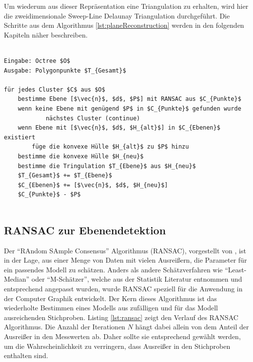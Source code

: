 Um wiederum aus dieser Repräsentation eine Triangulation zu erhalten, wird hier die zweidimensionale Sweep-Line Delaunay Triangulation durchgeführt. Die Schritte aus dem Algorithmus \ref{lst:planeReconstruction} werden in den folgenden Kapiteln näher beschreiben.

\begin{lstlisting}[mathescape,caption=Planaren Echtzeit Rekonstruktion, label=lst:planeReconstruction]

Eingabe: Octree $O$
Ausgabe: Polygonpunkte $T_{Gesamt}$

für jedes Cluster $C$ aus $O$
    bestimme Ebene [$\vec{n}$, $d$, $P$] mit RANSAC aus $C_{Punkte}$
    wenn keine Ebene mit genügend $P$ in $C_{Punkte}$ gefunden wurde
    		nächstes Cluster (continue)
    wenn Ebene mit [$\vec{n}$, $d$, $H_{alt}$] in $C_{Ebenen}$ existiert	
        füge die konvexe Hülle $H_{alt}$ zu $P$ hinzu	
    bestimme die konvexe Hülle $H_{neu}$
    bestimme die Tringulation $T_{Ebene}$ aus $H_{neu}$
    $T_{Gesamt}$ += $T_{Ebene}$
    $C_{Ebenen}$ += [$\vec{n}$, $d$, $H_{neu}$]
    $C_{Punkte}$ - $P$
		

\end{lstlisting}

\subsection{RANSAC zur Ebenendetektion}

Der \enquote{RAndom SAmple Consensus} Algorithmus (RANSAC), vorgestellt von \citet{fischler1981random}, ist in der Lage, aus einer Menge von Daten mit vielen Ausreißern, die Parameter für ein passendes Modell zu schätzen. Anders als andere Schätzverfahren wie \enquote{Least-Median} oder \enquote{M-Schätzer}, welche aus der Statistik Literatur entnommen und entsprechend angepasst wurden, wurde RANSAC speziell für die Anwendung in der Computer Graphik entwickelt. Der Kern dieses Algorithmus ist das wiederholte Bestimmen eines Modells aus zufälligen und für das Modell ausreichenden Stichproben. Listing \ref{lst:ransac} zeigt den Verlauf des RANSAC Algorithmus. Die Anzahl der Iterationen \(N\) hängt dabei allein von dem Anteil der Ausreißer in den Messwerten ab. Daher sollte sie entsprechend gewählt werden, um die Wahrscheinlichkeit zu verringern, dass Ausreißer in den Stichproben enthalten sind. \citep{derpanis2010overview} \\

